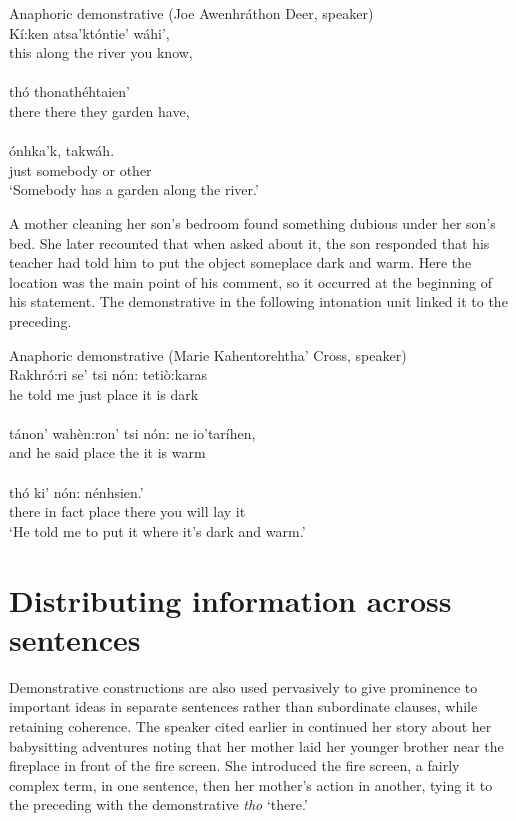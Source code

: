 \documentclass[output=paper,colorlinks,citecolor=brown]{langscibook}
\begin{document}
\ea \label{ex:mithun:11} Anaphoric demonstrative (Joe Awenhráthon Deer, speaker)\\
\gll Kí:ken atsa'któntie' wáhi',\\
     this {along the river} {you know,}\\
\medskip\\
\gll thó thonathéhtaien'\\
there {there they garden have,}\\
\medskip\\
\gll ónhka'k, takwáh.\\
{just somebody} {or other}\\
\glt `Somebody has a garden along the river.'
\z

A mother cleaning her son's bedroom found something dubious under her son's bed. She later recounted that when asked about it, the son responded that his teacher had told him to put the object someplace dark and warm. Here the location was the main point of his comment, so it occurred at the beginning of his statement. The demonstrative in the following intonation unit linked it to the preceding.


\ea\label{ex:mithun:12} Anaphoric demonstrative (Marie Kahentorehtha' Cross, speaker)\\
\gll  Rakhró:ri    se' {tsi nón:} tetiò:karas\\      
      {he told me} just place {it is dark}\\
\medskip\\
\gll tánon' wahèn:ron' {tsi nón:} ne io'taríhen,\\
and {he said} place the {it is warm}\\
\medskip\\
\gll thó  ki'  nón:  nénhsien.'\\
there {in fact} place {there you will lay it}\\
\glt `He told me to put it where it's dark and warm.'
\z

\section{Distributing information across sentences}

Demonstrative constructions are also used pervasively to give prominence to important ideas in separate sentences rather than subordinate clauses, while retaining coherence. The speaker cited earlier in  continued her story about her babysitting adventures noting that her mother laid her younger brother near the fireplace in front of the fire screen. She introduced the fire screen, a fairly complex term, in one sentence, then her mother's action in another, tying it to the preceding with the demonstrative \emph{tho} `there.'
\end{document}
